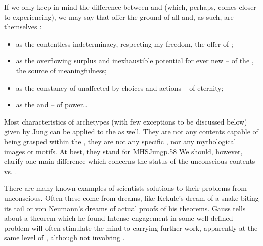 \pa If we only keep in mind the difference between  and
 (which, perhaps, comes closer to experiencing), we may say that
 offer the ground of all  and, as such, are
themselves :
\begin{itemize}\MyLPar
\item   
as the contentless indeterminacy, respecting my freedom, the 
offer  of ;
\item   
as the overflowing surplus and inexhaustible potential for ever new
 --  of the , the source of meaningfulness; 
\item   
as the constancy of  unaffected by 
choices and actions --  of eternity; 
\item   
as the  and  -- 
 of  power\ldots
\end{itemize}


\label{sub:notunconscious}\label{se:JungPlotinus}
%
Most characteristics of archetypes (with few exceptions to be discussed below)
given by Jung can be applied to the  as well.  They are not any
 contents capable of being grasped within the \hoa, they are not any
specific , nor any mythological images or motifs. At best,
they stand for \citet{a tendency to form such representations of a motif --
  representations that can vary a great deal in detail without losing their
  pattern.}{MHSJung}{p.58}  We should, however, clarify one main difference which
concerns the status of the unconscious contents vs. .

\pa There are many known examples of scientists 
solutions to their problems from unconscious.  Often these come from
dreams, like Kekule's dream of a snake biting its tail or von
Neumann's dreams of actual proofs of his theorems.  Gauss tells about
a theorem which he found  Intense
engagement in some well-defined problem will often stimulate the mind
to carrying further work, apparently at the same level of 
, although not involving .


